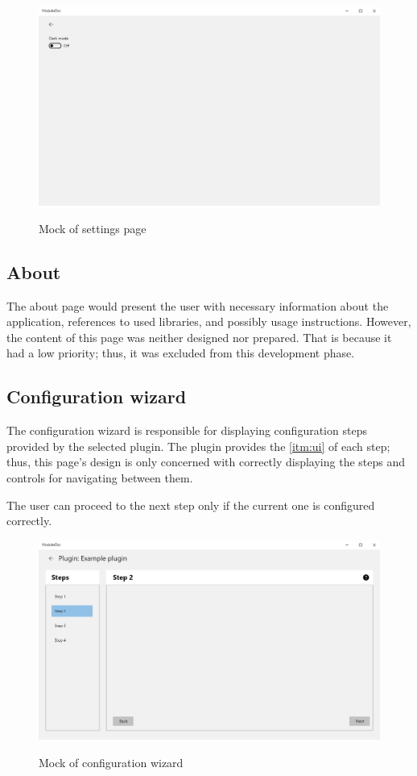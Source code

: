 \begin{figure}[H]
    \includegraphics[width=\linewidth]{img/mockSettings.png}
    \label{fig:settingsPage}
    \caption{Mock of settings page}
\end{figure}

\subsection{About}

The about page would present the user with necessary information about the application, references to used libraries, and possibly usage instructions. However, the content of this page was neither designed nor prepared. That is because it had a low priority; thus, it was excluded from this development phase.

\pagebreak
\subsection{Configuration wizard}

The configuration wizard is responsible for displaying configuration steps provided by the selected plugin. The plugin provides the \ref{itm:ui} of each step; thus, this page's design is only concerned with correctly displaying the steps and controls for navigating between them.

The user can proceed to the next step only if the current one is configured correctly.

\begin{figure}[H]
    \includegraphics[width=\linewidth]{img/mockConfigurator.png}
    \label{fig:configuratorPage}
    \caption{Mock of configuration wizard}
\end{figure}

